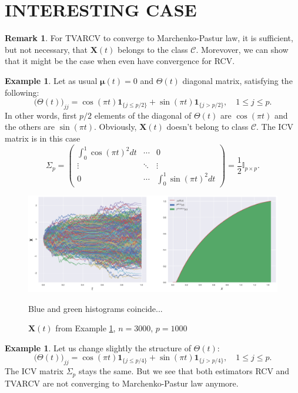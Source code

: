 \documentclass[a4paper,11pt]{article}
\theoremstyle{plain}
\theoremstyle{definition}
\newtheorem{exmp}[thm]{Example}
\newtheorem{rmrk}[thm]{Remark}
\begin{document}
    \section*{INTERESTING CASE}
    \begin{rmrk}
    	For TVARCV to converge to Marchenko-Pastur law, it is sufficient, but not necessary, that $\mathbf{X}(t)$ belongs to  the class $\mathcal{C}$. Morevover, we can show that it might be the case when even have convergence for RCV.
    \end{rmrk}
    \begin{exmp} \label{counter exmpl}
    	Let as usual $\boldsymbol{\mu}(t) =0$ and $\Theta(t)$ diagonal matrix, satisfying the following:
    	\[ \Big(\Theta(t)\Big)_{jj} = \cos(\pi t) \mathbf{1}_{\{j \leq p/2\}} + \sin(\pi t) \mathbf{1}_{\{j > p/2\}}, \quad 1 \leq j \leq p.  \]
    	In other words, first $p/2$ elements of the diagonal of $\Theta(t)$ are $\cos(\pi t)$ and the others are $\sin(\pi t)$. Obviously, $\mathbf{X}(t)$ doesn't belong to class $\mathcal{C}$. The ICV matrix is in this case
    	\[ \Sigma_p = \begin{pmatrix}
    	\int_{0}^{1} \cos(\pi t)^2 dt & \cdots & 0 \\
    	\vdots & \ddots & \vdots \\
    	0 & \cdots & \int_{0}^{1} \sin(\pi t)^2 dt
    	\end{pmatrix} 
    	= \frac{1}{2} \mathbb{I}_{p \times p}. \]
    \end{exmp}
    
    \begin{figure}
    	\begin{center} \centering
    		\includegraphics[scale=0.4]{counter}
    		\caption{ $\mathbf{X}(t)$ from Example \ref{counter exmpl}, $n = 3000$, $p=1000$ }
    		\smallskip
    		\small
    		Blue and green histograms coincide...
    	\end{center}
    \end{figure}
    
    \begin{exmp}
    	Let us change slightly the structure of $\Theta(t)$:
    	\[ \Big(\Theta(t)\Big)_{jj} = \cos(\pi t) \mathbf{1}_{\{j \leq p/4\}} + \sin(\pi t) \mathbf{1}_{\{j > p/4\}}, \quad 1 \leq j \leq p.\]
    	The ICV matrix $\Sigma_p$ stays the same. But we see that both estimators RCV and TVARCV are not converging to Marchenko-Pastur law anymore.
    \end{exmp}
    
\end{document}
